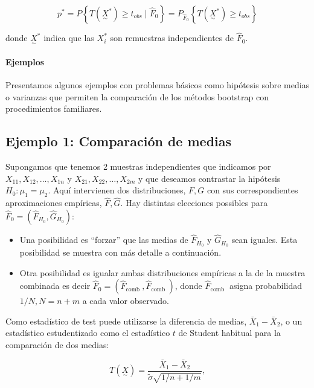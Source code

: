 \documentclass[
]{article}
\providecommand{\tightlist}{%
  \setlength{\itemsep}{0pt}\setlength{\parskip}{0pt}}
\begin{document}
\[
p^{*}=P\left\{T\left({\underset{\sim}{X}}^{*}\right) \geq t_{o b s} \mid \hat{F}_{0}\right\}=P_{\hat{F}_{0}}\left\{T\left({\underset{\sim}{X}}^{*}\right) \geq t_{o b s}\right\}
\]

donde \({\underset{\sim}{X}}^{*}\) indica que las \(X_{i}^{*}\) son remuestras independientes de \(\hat{F}_{0}\).

\paragraph{Ejemplos}\label{ejemplos}

Presentamos algunos ejemplos con problemas básicos como hipótesis sobre medias o varianzas que permiten la comparación de los métodos bootstrap con procedimientos familiares.

\subsection{Ejemplo 1: Comparación de medias}\label{ejemplo-1-comparaciuxf3n-de-medias}

Supongamos que tenemos 2 muestras independientes que indicamos por \(X_{11}, X_{12}, \ldots, X_{1 n}\) y \(X_{21}, X_{22}, \ldots, X_{2 m}\) y que deseamos contrastar la hipótesis \(H_{0}: \mu_{1}=\mu_{2}\). Aquí intervienen dos distribuciones, \(F, G\) con sus correspondientes aproximaciones empíricas, \(\hat{F}, \hat{G}\). Hay distintas elecciones possibles para \(\hat{F}_{0}=\left(\hat{F}_{H_{0}}, \hat{G}_{H_{0}}\right):\)

\begin{itemize}
\tightlist
\item
  Una posibilidad es ``forzar'' que las medias de \(\hat{F}_{H_{0}}\) y \(\hat{G}_{H_{0}}\) sean iguales. Esta posibilidad se muestra con más detalle a continuación.
\item
  Otra posibilidad es igualar ambas distribuciones empíricas a la de la muestra combinada es decir \(\hat{F}_{0}=\left(\hat{F}_{\text {comb }}, \hat{F}_{\text {comb }}\right)\), donde \(\hat{F}_{\text {comb }}\) asigna probabilidad \(1 / N, N=n+m\) a cada valor observado.
\end{itemize}

Como estadístico de test puede utilizarse la diferencia de medias, \(\bar{X}_{1}-\bar{X}_{2}\), o un estadístico estudentizado como el estadístico \(t\) de Student habitual para la comparación de dos medias:

\[
T(\underset{\sim}{X})=\frac{\bar{X}_{1}-\bar{X}_{2}}{\tilde{\sigma} \sqrt{1 / n+1 / m}},
\]
\end{document}
